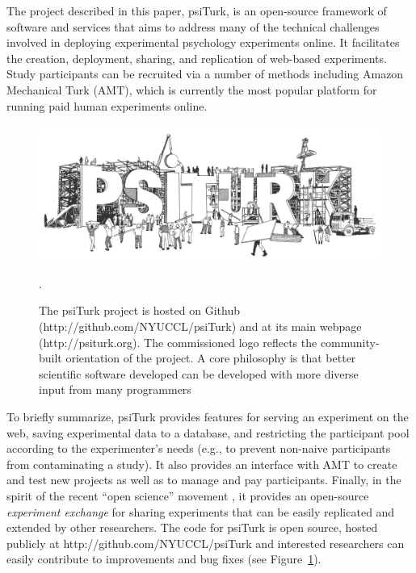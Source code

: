 \documentclass[twocolumn]{svjour3}          %
\newcommand{\psiturk}[0]{\textsf{psiTurk}}
\begin{document}
The project described in this paper, \psiturk{}, is an open-source framework of 
software and services that aims to address many of the technical challenges
involved in deploying experimental psychology experiments online.
It facilitates the creation, deployment, sharing, and replication of web-based experiments.
Study participants can be recruited via a number of methods including Amazon 
Mechanical Turk (AMT), which is currently the most popular platform for running 
paid human experiments online.

\begin{figure}[tp]
\centering
\includegraphics[scale=.30]{figures/psiturk_logo.jpg}
\caption{The \psiturk{} project is hosted on Github 
(http://github.com/NYUCCL/psiTurk) and at its main webpage (\textsf{http://psiturk.org}). 
The commissioned logo reflects the community-built orientation of the project.  A 
core philosophy is that better scientific software developed can be developed 
with more diverse input from many programmers~\citep{Raymond:1999zt}}.
\label{fig:logo}
\end{figure}

To briefly summarize, \psiturk{} provides features for serving an 
experiment on the web, saving experimental data to a database, and restricting the 
participant pool according to the experimenter's needs (e.g., to prevent non-naive 
participants from contaminating a study). It also provides an interface with AMT to 
create and test new projects as well as to manage and pay participants. Finally, in 
the spirit of the recent ``open science'' movement \citep{Collaboration:2012vf},
it provides  an open-source \emph{experiment exchange} for sharing experiments 
that can be easily replicated and extended by other researchers.  The code for 
\psiturk{} is open source, hosted publicly at
\textsf{http://github.com/NYUCCL/psiTurk} and interested researchers can easily 
contribute to improvements and bug fixes (see Figure~\ref{fig:logo}).
\end{document}

